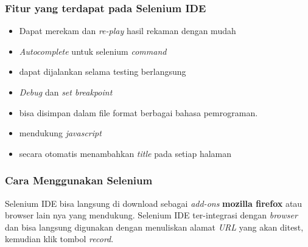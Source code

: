 \documentclass[9pt,twocolumn,twoside]{Gunadarma}
\begin{document}
\subsubsection{Fitur yang terdapat pada Selenium IDE}
\begin{itemize}
	\item Dapat merekam dan \textit{re-play} hasil rekaman dengan mudah
	\item \textit{Autocomplete} untuk selenium \textit{command}
	\item dapat dijalankan selama testing berlangsung
	\item \textit{Debug} dan \textit{set breakpoint}
	\item bisa disimpan dalam file format berbagai bahasa pemrograman.
	\item mendukung \textit{javascript}
	\item secara otomatis menambahkan \textit{title} pada setiap halaman
\end{itemize}

\subsubsection{Cara Menggunakan Selenium}
Selenium IDE bisa langsung di download sebagai \textit{add-ons} \textbf{mozilla firefox} atau browser lain nya yang mendukung. Selenium IDE ter-integrasi dengan \textit{browser} dan bisa langsung digunakan dengan menuliskan alamat \textit{URL} yang akan ditest, kemudian klik tombol \textit{record}. 
\end{document}
